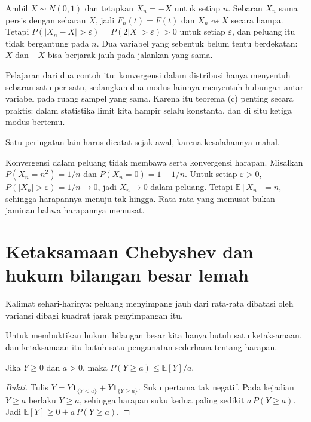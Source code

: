 \begin{contoh}
Ambil $X\sim N(0,1)$ dan tetapkan $X_n=-X$ untuk setiap $n$. Sebaran $X_n$ sama
persis dengan sebaran $X$, jadi $F_n(t)=F(t)$ dan $X_n\rightsquigarrow X$ secara
hampa. Tetapi $P(|X_n-X|>\varepsilon)=P(2|X|>\varepsilon)>0$ untuk setiap
$\varepsilon$, dan peluang itu tidak bergantung pada $n$. Dua variabel yang
sebentuk belum tentu berdekatan: $X$ dan $-X$ bisa berjarak jauh pada jalankan
yang sama.
\end{contoh}

Pelajaran dari dua contoh itu: konvergensi dalam distribusi hanya menyentuh
sebaran satu per satu, sedangkan dua modus lainnya menyentuh hubungan
antar-variabel pada ruang sampel yang sama. Karena itu teorema (c) penting secara
praktis: dalam statistika limit kita hampir selalu konstanta, dan di situ ketiga
modus bertemu.

Satu peringatan lain harus dicatat sejak awal, karena kesalahannya mahal.

\begin{catatan}
Konvergensi dalam peluang tidak membawa serta konvergensi harapan. Misalkan
$P(X_n=n^2)=1/n$ dan $P(X_n=0)=1-1/n$. Untuk setiap $\varepsilon>0$,
$P(|X_n|>\varepsilon)=1/n\to0$, jadi $X_n\to0$ dalam peluang. Tetapi
$\mathbb{E}[X_n]=n$, sehingga harapannya menuju tak hingga. Rata-rata yang
memusat bukan jaminan bahwa harapannya memusat.
\end{catatan}

\section{Ketaksamaan Chebyshev dan hukum bilangan besar lemah}

Kalimat sehari-harinya: peluang menyimpang jauh dari rata-rata dibatasi oleh
variansi dibagi kuadrat jarak penyimpangan itu.

Untuk membuktikan hukum bilangan besar kita hanya butuh satu ketaksamaan, dan
ketaksamaan itu butuh satu pengamatan sederhana tentang harapan.

\begin{lemma}[Markov]
Jika $Y\ge0$ dan $a>0$, maka $P(Y\ge a)\le \mathbb{E}[Y]/a$.
\end{lemma}

\begin{proof}[Bukti]
Tulis $Y=Y\mathbf{1}_{\{Y<a\}}+Y\mathbf{1}_{\{Y\ge a\}}$. Suku pertama tak
negatif. Pada kejadian $Y\ge a$ berlaku $Y\ge a$, sehingga harapan suku kedua
paling sedikit $a\,P(Y\ge a)$. Jadi
$\mathbb{E}[Y]\ge 0+a\,P(Y\ge a)$.
\end{proof}

